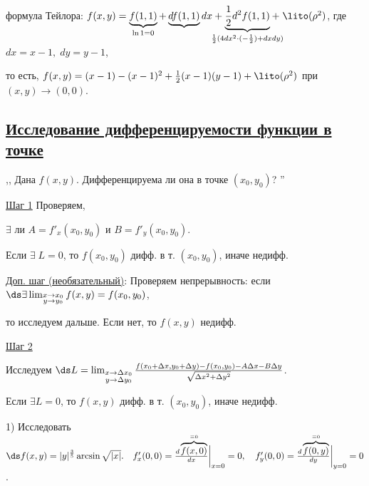 \smallskip

\smallskip

формула Тейлора: \; $ f(x,y)=\underbrace{f(1,1)}_{\ln1=0} + \underbrace{df(1,1)}{dx} + \!\!\!\!\!\!\!\! \underbrace{\frac{1}{2}d^2f(1,1)}_{\frac{1}{2}(4dx^2 \cdot (-\frac{1}{2})+dxdy)} \!\!\!\!\!\!\!\! + \; \lito(\rho^2)$, \; где \; $dx = x-1, \; dy = y-1$,

то есть, \; $f(x,y) = (x-1) -(x-1)^2 + \frac{1}{2}(x-1)(y-1) + \lito(\rho^2)$ \; при \; $(x,y) \to (0,0)$.

\begin{center}
\subsection{\underline{Исследование дифференцируемости функции в точке}}
\end{center}

\bigskip

,, Дана $f(x,y)$. Дифференцируема ли она в точке $(x_0,y_0)$? ''

\underline{Шаг 1} Проверяем, \; \parbox[t]{0.95\linewidth}{$\exists$ ли $A = f'_x(x_0,y_0)$ и $B = f'_y(x_0,y_0)$.

Если $\exists \; L = 0$, \; то \; $f(x_0,y_0)$ \; дифф. в т. $(x_0,y_0)$, \; иначе недифф.}

\smallskip

\underline{Доп. шаг (необязательный)}: Проверяем непрерывность: если \; $\ds \exists \lim_{\substack{x \to x_0 \\ y \to y_0}} f(x,y) = f(x_0,y_0)$,

то исследуем дальше. Если нет, то \; $f(x,y)$ \; недифф.

\smallskip

\underline{Шаг 2} \; \parbox[t]{0.95\linewidth}{Исследуем  $\ds L = \lim_{\substack{x \to \Delta x_0 \\ y \to \Delta y_0}} \frac{f(x_0+\Delta x, y_0 + \Delta y) - f(x_0,y_0) - A\Delta x - B\Delta y}{\sqrt{\Delta x^2 + \Delta y^2}}$.

\smallskip

Если $\exists L = 0$, то $f(x,y)$ дифф. в т. $(x_0,y_0)$, иначе недифф.}

\bigskip

\Examples

1)\; Исследовать \; $\ds f(x,y) = |y|^\frac{3}{5} \arcsin\sqrt{|x|}. \quad f'_x(0,0) = \frac{d\overbrace{f(x,0)}^{\equiv 0}}{dx}\bigg|_{x=0} = 0, \quad f'_y(0,0) = \frac{d\overbrace{f(0,y)}^{\equiv 0}}{dy}\bigg|_{y=0} = 0$.

